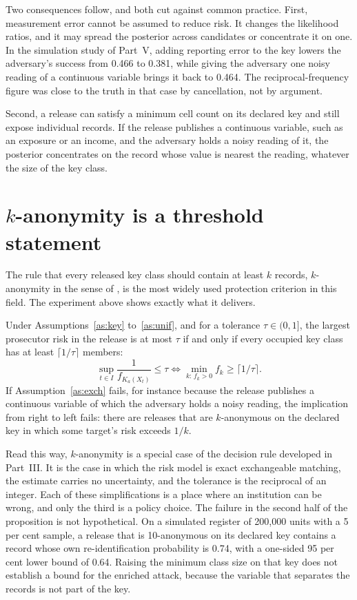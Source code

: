 Two consequences follow, and both cut against common practice. First, measurement
error cannot be assumed to reduce risk. It changes the likelihood ratios, and it
may spread the posterior across candidates or concentrate it on one. In the
simulation study of Part~V, adding reporting error to the key lowers the
adversary's success from 0.466 to 0.381, while giving the adversary one noisy
reading of a continuous variable brings it back to 0.464. The reciprocal-frequency
figure was close to the truth in that case by cancellation, not by argument.

Second, a release can satisfy a minimum cell count on its declared key and still
expose individual records. If the release publishes a continuous variable, such as
an exposure or an income, and the adversary holds a noisy reading of it, the
posterior concentrates on the record whose value is nearest the reading, whatever
the size of the key class.

\section{$k$-anonymity is a threshold statement}

The rule that every released key class should contain at least $k$ records,
$k$-anonymity in the sense of \citet{sweeney2002}, is the most widely used
protection criterion in this field. The experiment above shows exactly what it
delivers.

\begin{proposition}\label{prop:kanon}
Under Assumptions~\ref{as:key} to~\ref{as:unif}, and for a tolerance
$\tau \in (0,1]$, the largest prosecutor risk in the release is at most $\tau$ if
and only if every occupied key class has at least $\lceil 1/\tau \rceil$ members:
\begin{equation}\label{eq:kanon}
\sup_{t \in I} \frac{1}{f_{K_a(X_t)}} \le \tau
\iff \min_{k:\,f_k>0} f_k \ge \lceil 1/\tau \rceil .
\end{equation}
If Assumption~\ref{as:exch} fails, for instance because the release publishes a
continuous variable of which the adversary holds a noisy reading, the implication
from right to left fails: there are releases that are $k$-anonymous on the declared
key in which some target's risk exceeds $1/k$.
\end{proposition}

Read this way, $k$-anonymity is a special case of the decision rule developed in
Part~III. It is the case in which the risk model is exact exchangeable matching,
the estimate carries no uncertainty, and the tolerance is the reciprocal of an
integer. Each of these simplifications is a place where an institution can be
wrong, and only the third is a policy choice. The failure in the second half of
the proposition is not hypothetical. On a simulated register of 200,000 units with
a 5 per cent sample, a release that is 10-anonymous on its declared key contains a
record whose own re-identification probability is 0.74, with a one-sided 95 per
cent lower bound of 0.64. Raising the minimum class size on that key does not
establish a bound for the enriched attack, because the variable that separates the
records is not part of the key.

